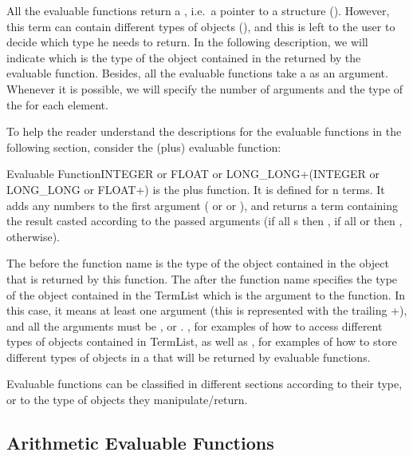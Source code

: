 All the evaluable functions return a , i.e.\ a pointer to a
 structure (). However, this
term can contain different types of objects (), and this is left
to the user to decide which type he needs to return. In the following
description, we will indicate which is the type of the object contained in the
 returned by the evaluable function. Besides, all the evaluable
functions take a  as an argument. Whenever it is possible, we
will specify the number of arguments and the type of the  for each
element.

To help the reader understand the descriptions for the evaluable functions
in the following section, consider the \code{+} (plus) evaluable function:

\begin{typeefa}{Evaluable Function}{INTEGER or FLOAT or
    LONG\_LONG}{+}{({INTEGER or LONG\_LONG or FLOAT}+)} is the plus function.
  It is defined for n terms. It adds any numbers to the first argument
  ( or  or ), and returns a term
  containing the result casted according to the passed arguments (if all
  s then , if all  or
   then ,  otherwise).
\end{typeefa}

The  before the function name \code{+}
is the type of the object contained in the  object that is
returned by this \code{+} function.  The  after the function name specifies the type of the object
contained in the TermList which is the argument to the  function.
In this case, it means at least one argument (this is represented with the
trailing +), and all the arguments must be ,  or
 .  , for examples of how
to access different types of objects contained in TermList, as well as
, for examples of how to
store different types of objects in a  that will be returned by
evaluable functions.

Evaluable functions can be classified in different sections according to their
type, or to the type of objects they manipulate/return.



\subsection{Arithmetic Evaluable Functions}

